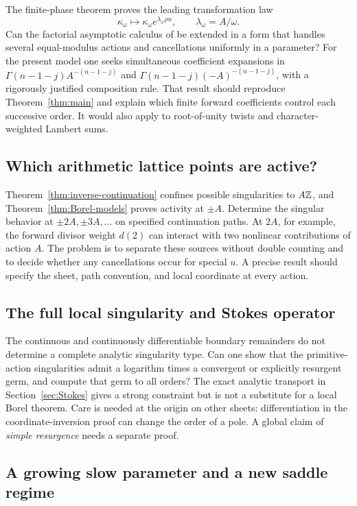 The finite-phase theorem proves the leading transformation law
\[
 \kappa_\omega\longmapsto
 \kappa_\omega e^{\lambda_\omega\rho u},\qquad
 \lambda_\omega=A/\omega.
\]
Can the factorial asymptotic calculus of \cite{Borinsky2018} be extended
in a form that handles several equal-modulus actions and cancellations
uniformly in a parameter? For the present model one seeks simultaneous
coefficient expansions in
$\Gamma(n-1-j)A^{-(n-1-j)}$ and
$\Gamma(n-1-j)(-A)^{-(n-1-j)}$, with a rigorously justified
composition rule.
That result should reproduce Theorem~\ref{thm:main} and explain which
finite forward coefficients control each successive order. It would
also apply to root-of-unity twists and character-weighted Lambert sums.

\subsection{Which arithmetic lattice points are active?}

Theorem~\ref{thm:inverse-continuation} confines possible singularities to
$A\mathbb Z$, and Theorem~\ref{thm:Borel-models} proves activity at $\pm A$.
Determine the singular behavior at $\pm2A,\pm3A,\ldots$ on specified
continuation paths. At $2A$, for example, the forward divisor weight
$d(2)$ can interact with two nonlinear contributions of action $A$.
The problem is to separate these sources without double counting and
to decide whether any cancellations occur for special $u$.
A precise result should specify the sheet, path convention, and local
coordinate at every action.

\subsection{The full local singularity and Stokes operator}

The continuous and continuously differentiable boundary remainders do
not determine a complete analytic singularity type. Can one show that
the primitive-action singularities admit a logarithm times a convergent
or explicitly resurgent germ, and compute that germ to all orders?
The exact analytic transport in Section~\ref{sec:Stokes} gives a strong
constraint but is not a substitute for a local Borel theorem.
Care is needed at the origin on other sheets: differentiation in the
coordinate-inversion proof can change the order of a pole. A global
claim of \emph{simple resurgence} needs a separate proof.

\subsection{A growing slow parameter and a new saddle regime}

